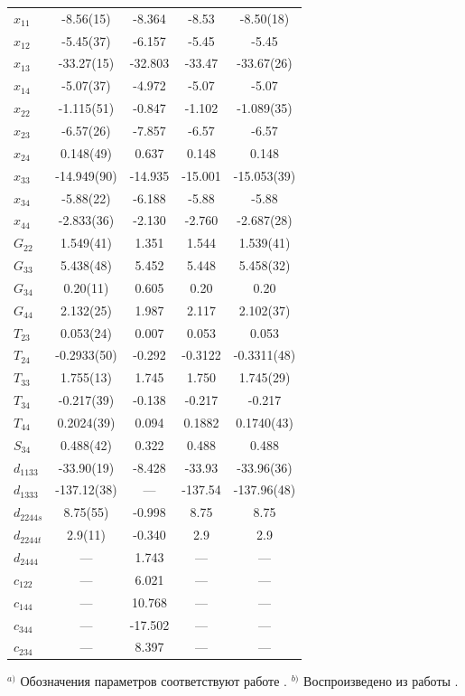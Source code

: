 \begin{longtable}{lcccc}
$x_{11}$ & -8.56(15) & -8.364 & -8.53 & -8.50(18) \\$x_{12}$ & -5.45(37) & -6.157 & -5.45 & -5.45 \\$x_{13}$ & -33.27(15) & -32.803 & -33.47 & -33.67(26) \\$x_{14}$ & -5.07(37) & -4.972 & -5.07 & -5.07 \\$x_{22}$ & -1.115(51) & -0.847 & -1.102 & -1.089(35) \\$x_{23}$ & -6.57(26) & -7.857 & -6.57 & -6.57 \\$x_{24}$ & 0.148(49) & 0.637 & 0.148 & 0.148 \\$x_{33}$ & -14.949(90) & -14.935 & -15.001 & -15.053(39) \\$x_{34}$ & -5.88(22) & -6.188 & -5.88 & -5.88 \\$x_{44}$ & -2.833(36) & -2.130 & -2.760 & -2.687(28) \\$G_{22}$ & 1.549(41) & 1.351 & 1.544 & 1.539(41) \\$G_{33}$ & 5.438(48) & 5.452 & 5.448 & 5.458(32) \\$G_{34}$ & 0.20(11) & 0.605 & 0.20 & 0.20 \\$G_{44}$ & 2.132(25) & 1.987 & 2.117 & 2.102(37) \\$T_{23}$ & 0.053(24) & 0.007 & 0.053 & 0.053 \\$T_{24}$ & -0.2933(50) & -0.292 & -0.3122 & -0.3311(48) \\$T_{33}$ & 1.755(13) & 1.745 & 1.750 & 1.745(29) \\$T_{34}$ & -0.217(39) & -0.138 & -0.217 & -0.217 \\$T_{44}$ & 0.2024(39) & 0.094 & 0.1882 & 0.1740(43) \\$S_{34}$ & 0.488(42) & 0.322 & 0.488 & 0.488 \\$d_{1133}$ & -33.90(19) & -8.428 & -33.93 & -33.96(36) \\$d_{1333}$ & -137.12(38) & --- & -137.54 & -137.96(48) \\$d_{2244s}$ & 8.75(55) & -0.998 & 8.75 & 8.75 \\$d_{2244t}$ & 2.9(11) & -0.340 & 2.9 & 2.9 \\$d_{2444 }$ & --- & 1.743 & --- & --- \\$c_{122 } $ & --- & 6.021 & --- & --- \\$c_{144 } $ & --- & 10.768 & --- & --- \\$c_{344 } $ & --- & -17.502 & --- & --- \\$c_{234 } $ & --- & 8.397 & --- & --- \\\end{longtable}
\vspace{0.5ex}
\begin{minipage}{0.95\textwidth}
\scriptsize
$^{a)}$ Обозначения параметров соответствуют работе \cite{hecht}.\quad
$^{b)}$ Воспроизведено из работы \cite{wang}.
\end{minipage}
\endgroup
